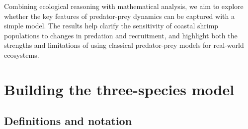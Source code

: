 \documentclass{article}
\begin{document}
\vspace{5mm}

\noindent Combining ecological reasoning with mathematical analysis, we aim to explore whether the key features of predator-prey dynamics can be captured with a simple model. The results help clarify the sensitivity of coastal shrimp populations to changes in predation and recruitment, and highlight both the strengths and limitations of using classical predator-prey models for real-world ecosystems.


\section{Building the three-species model}\label{sec:model} 
\subsection{Definitions and notation} %
\end{document}
